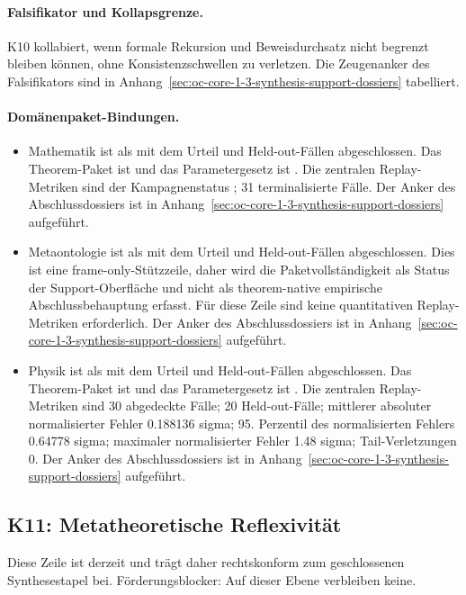 \paragraph{Falsifikator und Kollapsgrenze.}
K10 kollabiert, wenn formale Rekursion und Beweisdurchsatz nicht begrenzt bleiben können, ohne Konsistenzschwellen zu verletzen.
Die Zeugenanker des Falsifikators sind in Anhang~\ref{sec:oc-core-1-3-synthesis-support-dossiers} tabelliert.

\paragraph{Domänenpaket-Bindungen.}
\begin{itemize}[leftmargin=1.6em,nosep]
\item Mathematik ist als  mit dem Urteil  und  Held-out-Fällen abgeschlossen. Das Theorem-Paket ist  und das Parametergesetz ist . Die zentralen Replay-Metriken sind der Kampagnenstatus ; 31 terminalisierte Fälle. Der Anker des Abschlussdossiers ist in Anhang~\ref{sec:oc-core-1-3-synthesis-support-dossiers} aufgeführt.
\item Metaontologie ist als  mit dem Urteil  und  Held-out-Fällen abgeschlossen. Dies ist eine frame-only-Stützzeile, daher wird die Paketvollständigkeit als Status der Support-Oberfläche und nicht als theorem-native empirische Abschlussbehauptung erfasst. Für diese Zeile sind keine quantitativen Replay-Metriken erforderlich. Der Anker des Abschlussdossiers ist in Anhang~\ref{sec:oc-core-1-3-synthesis-support-dossiers} aufgeführt.
\item Physik ist als  mit dem Urteil  und  Held-out-Fällen abgeschlossen. Das Theorem-Paket ist  und das Parametergesetz ist . Die zentralen Replay-Metriken sind 30 abgedeckte Fälle; 20 Held-out-Fälle; mittlerer absoluter normalisierter Fehler 0.188136 sigma; 95. Perzentil des normalisierten Fehlers 0.64778 sigma; maximaler normalisierter Fehler 1.48 sigma; Tail-Verletzungen 0. Der Anker des Abschlussdossiers ist in Anhang~\ref{sec:oc-core-1-3-synthesis-support-dossiers} aufgeführt.
\end{itemize}

\subsection{K11: Metatheoretische Reflexivität}
\label{sec:oc-core-1-3-synthesis-k11}
Diese Zeile ist derzeit  und trägt daher rechtskonform zum geschlossenen Synthesestapel bei.
Förderungsblocker: Auf dieser Ebene verbleiben keine.


